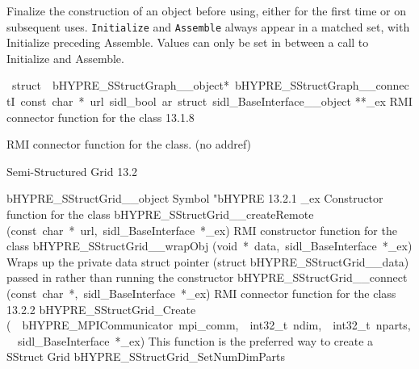 \documentclass{article}
\begin{document}
\begin{cxxentry}
\begin{cxxentry}
\begin{cxxfunction}
\begin{cxxdoc}
Finalize the construction of an object before using, either
for the first time or on subsequent uses. {\tt Initialize}
and {\tt Assemble} always appear in a matched set, with
Initialize preceding Assemble. Values can only be set in
between a call to Initialize and Assemble.
\end{cxxdoc}
\end{cxxfunction}
\begin{cxxvariable}
{\ struct\ \ bHYPRE\_SStructGraph\_\_object*\ bHYPRE\_SStructGraph\_\_connectI\ const\ char\ *\ url\ sidl\_bool\ ar\ struct\ sidl\_BaseInterface\_\_object}
        {**\_ex}
        {}
        {
RMI connector function for the class}
        {13.1.8}
\begin{cxxdoc}

RMI connector function for the class. (no addref)
\end{cxxdoc}
\end{cxxvariable}
\end{cxxentry}
\begin{cxxentry}
{}
        {Semi-Structured Grid}
        {}
        {
}
        {13.2}
\begin{cxxnames}
        {bHYPRE\_SStructGrid\_\_object}
        {}
        {
Symbol "bHYPRE}
        {13.2.1}
        {\_ex}
        {}
        {
Constructor function for the class}
        {}
\label{cxx.13.2.9}
        {bHYPRE\_SStructGrid\_\_createRemote}
        {(const\ char\ *\ url,\ sidl\_BaseInterface\ *\_ex)}
        {
RMI constructor function for the class}
        {}
\label{cxx.13.2.10}
        {bHYPRE\_SStructGrid\_\_wrapObj}
        {(void\ *\ data,\ sidl\_BaseInterface\ *\_ex)}
        {
Wraps up the private data struct pointer (struct bHYPRE\_SStructGrid\_\_data) passed in rather than running the constructor}
        {}
\label{cxx.13.2.11}
        {bHYPRE\_SStructGrid\_\_connect}
        {(const\ char\ *,\ sidl\_BaseInterface\ *\_ex)}
        {
RMI connector function for the class}
        {13.2.2}
        {bHYPRE\_SStructGrid\_Create}
        {(\ \ bHYPRE\_MPICommunicator\ mpi\_comm,\ \ int32\_t\ ndim,\ \ int32\_t\ nparts,\ \ sidl\_BaseInterface\ *\_ex)}
        {
This function is the preferred way to create a SStruct Grid}
        {}
\label{cxx.13.2.12}
        {bHYPRE\_SStructGrid\_SetNumDimParts}

\end{cxxnames}
\end{cxxentry}
\end{cxxentry}
\end{document}
